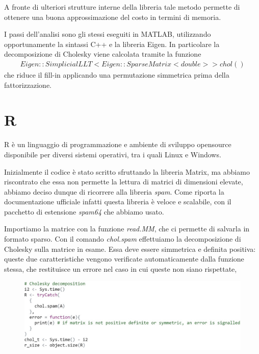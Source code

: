 \documentclass[a4paper,12pt]{article}
\begin{document}
\noindent A fronte di ulteriori strutture interne della libreria tale metodo permette di ottenere una buona approssimazione del costo in termini di memoria. 
\bigskip

\noindent I passi dell’analisi sono gli stessi eseguiti in MATLAB, utilizzando opportunamente la sintassi C++ e la libreria Eigen. In particolare la decomposizione di Cholesky viene calcolata tramite la funzione 
\begin{align*}
Eigen::SimplicialLLT<Eigen::SparseMatrix<double>> chol()
\end{align*}
che riduce il fill-in applicando una permutazione simmetrica prima della fattorizzazione. %

\newpage

\fancyhf{}
\fancyfoot[C]{\thepage}

\section{R}
R è un linguaggio di programmazione e ambiente di sviluppo opensource disponibile per diversi sistemi operativi, tra i quali Linux e Windows.
\bigskip

\noindent Inizialmente il codice è stato scritto sfruttando la libreria Matrix, ma abbiamo riscontrato che essa non permette la lettura di matrici di dimensioni elevate, abbiamo deciso dunque di ricorrere alla libreria \textit{spam}. Come riporta la documentazione ufficiale infatti questa libreria è veloce e scalabile, con il pacchetto di estensione \textit{spam64} che abbiamo usato.
\bigskip

\noindent Importiamo la matrice con la funzione \textit{read.MM}, che ci permette di salvarla in formato sparso.
Con il comando \textit{chol.spam} effettuiamo la decomposizione di Cholesky sulla matrice in esame. Essa deve essere simmetrica e definita positiva: queste due caratteristiche vengono verificate automaticamente dalla funzione stessa, che restituisce un errore nel caso in cui queste non siano rispettate, 
\bigskip

\begin{figure}[H]
\centering
\includegraphics[width=0.8\linewidth]{img/R1.jpg}
\end{figure}
\end{document}
